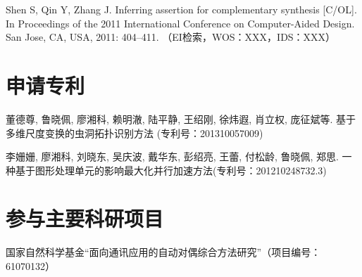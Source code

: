 \begin{resume}
\begin{enumerate}[{[}1{]}]
  \item Shen S, Qin Y, Zhang J. Inferring assertion for complementary synthesis [C/OL]. In
Proceedings of the 2011 International Conference on Computer-Aided Design. San
Jose, CA, USA, 2011: 404–411. （EI检索，WOS：XXX，IDS：XXX）


  \end{enumerate}

  \section*{申请专利} %
  \begin{enumerate}[{[}1{]}]
  \addtolength{\itemsep}{-.36\baselineskip}%
  \item 董德尊, 鲁晓佩, 廖湘科, 赖明澈, 陆平静, 王绍刚, 徐炜遐, 肖立权, 庞征斌等. 基于多维尺度变换的虫洞拓扑识别方法 (专利号：201310057009)
  \item 李姗姗, 廖湘科, 刘晓东, 吴庆波, 戴华东, 彭绍亮, 王蕾, 付松龄, 鲁晓佩, 郑思. 一种基于图形处理单元的影响最大化并行加速方法(专利号：201210248732.3)
  \end{enumerate}

  \section*{参与主要科研项目} %
  \begin{enumerate}[{[}1{]}]
  \addtolength{\itemsep}{-.36\baselineskip}%
  \item 国家自然科学基金“面向通讯应用的自动对偶综合方法研究”（项目编号：61070132）
  \end{enumerate}
\end{resume}
